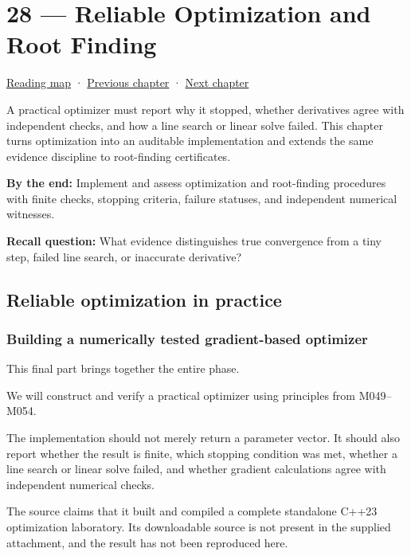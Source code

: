 \hypertarget{02-foundations-ii-ch028}{}
\chapter{28 --- Reliable Optimization and Root Finding}\label{02-foundations-ii-ch028-reliable-optimization-and-root-finding}

\hyperref[volume-reading-map]{Reading map} · \hyperref[02-foundations-ii-ch027]{Previous chapter} · \hyperref[02-foundations-ii-ch029]{Next chapter}

A practical optimizer must report why it stopped, whether derivatives agree with independent checks, and how a line search or linear solve failed. This chapter turns optimization into an auditable implementation and extends the same evidence discipline to root-finding certificates.

\textbf{By the end:} Implement and assess optimization and root-finding procedures with finite checks, stopping criteria, failure statuses, and independent numerical witnesses.

\textbf{Recall question:} What evidence distinguishes true convergence from a tiny step, failed line search, or inaccurate derivative?

\section{Reliable optimization in practice}\label{02-foundations-ii-ch028-reliable-optimization-in-practice}

\subsection{Building a numerically tested gradient-based optimizer}\label{02-foundations-ii-ch028-building-a-numerically-tested-gradient-based-optimizer}

This final part brings together the entire phase.

We will construct and verify a practical optimizer using principles from M049--M054.

The implementation should not merely return a parameter vector. It should also report whether the result is finite, which stopping condition was met, whether a line search or linear solve failed, and whether gradient calculations agree with independent numerical checks.

The source claims that it built and compiled a complete standalone C++23 optimization laboratory. Its downloadable source is not present in the supplied attachment, and the result has not been reproduced here.

